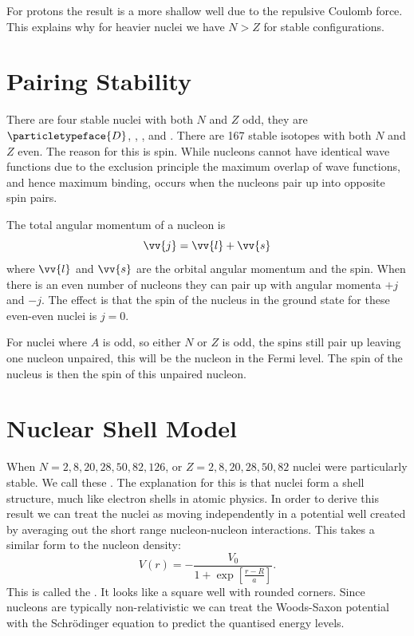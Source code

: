 \documentclass[fleqn]{NotesClass}
\newcommand{\Pdeuteron}{\ensuremath{\particletypeface{D}}}
\begin{document}
    For protons the result is a more shallow well due to the repulsive Coulomb force.
    This explains why for heavier nuclei we have \(N > Z\) for stable configurations.
    
    \section{Pairing Stability}
    There are four stable nuclei with both \(N\) and \(Z\) odd, they are \Pdeuteron, , , and .
    There are 167 stable isotopes with both \(N\) and \(Z\) even.
    The reason for this is spin.
    While nucleons cannot have identical wave functions due to the exclusion principle the maximum overlap of wave functions, and hence maximum binding, occurs when the nucleons pair up into opposite spin pairs.
    
    The total angular momentum of a nucleon is
    \begin{equation}
        \vv{j} = \vv{l} + \vv{s}
    \end{equation}
    where \(\vv{l}\) and \(\vv{s}\) are the orbital angular momentum and the spin.
    When there is an even number of nucleons they can pair up with angular momenta \(+j\) and \(-j\).
    The effect is that the spin of the nucleus in the ground state for these even-even nuclei is \(j = 0\).
    
    For nuclei where \(A\) is odd, so either \(N\) or \(Z\) is odd, the spins still pair up leaving one nucleon unpaired, this will be the nucleon in the Fermi level.
    The spin of the nucleus is then the spin of this unpaired nucleon.
    
    \section{Nuclear Shell Model}
    When \(N = 2, 8, 20, 28, 50, 82, 126\), or \(Z = 2, 8, 20, 28, 50, 82\) nuclei were particularly stable.
    We call these .
    The explanation for this is that nuclei form a shell structure, much like electron shells in atomic physics.
    In order to derive this result we can treat the nuclei as moving independently in a potential well created by averaging out the short range nucleon-nucleon interactions.
    This takes a similar form to the nucleon density:
    \begin{equation}
        V(r) = -\frac{V_0}{1 + \exp[\frac{r - R}{a}]}.
    \end{equation}
    This is called the .
    It looks like a square well with rounded corners.
    Since nucleons are typically non-relativistic we can treat the Woods-Saxon potential with the Schr\"odinger equation to predict the quantised energy levels.
    
\end{document}
